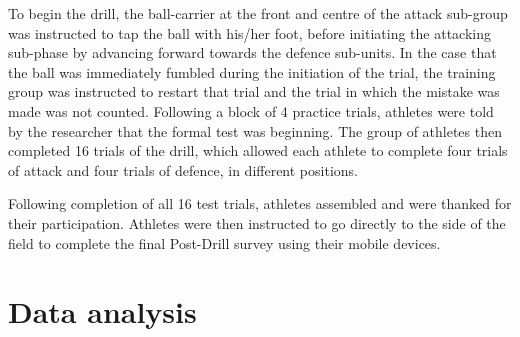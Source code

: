 To begin the drill, the ball-carrier at the front and centre of the attack sub-group was instructed to tap the ball with his/her foot, before initiating the attacking sub-phase by advancing forward towards the defence sub-units.  In the case that the ball was immediately fumbled during the initiation of the trial, the training group was instructed to restart that trial and the trial in which the mistake was made was not counted.  Following a block of 4 practice trials, athletes were told by the researcher that the formal test was beginning.  The group of athletes then completed 16 trials of the drill, which allowed each athlete to complete four trials of attack and four trials of defence, in different positions.

Following completion of all 16 test trials, athletes assembled and were thanked for their participation.  Athletes were then instructed to go directly to the side of the field to complete the final Post-Drill survey using their mobile devices.




\clearpage
\section{Data analysis}


